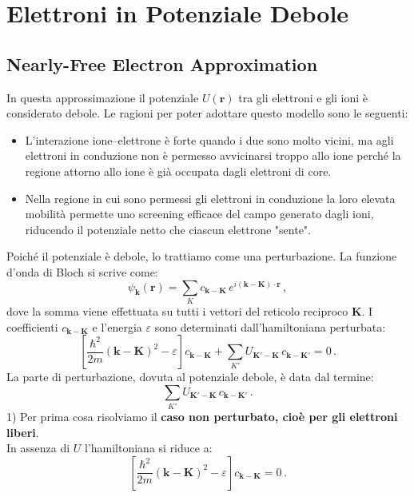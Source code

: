 
\chapter{Elettroni in Potenziale Debole}

\section{Nearly-Free Electron Approximation}
In questa approssimazione il potenziale \( U(\mathbf{r}) \) tra gli elettroni e gli ioni è considerato debole. Le ragioni per poter adottare questo modello sono le seguenti:
\begin{itemize}
	\item L'interazione ione--elettrone è forte quando i due sono molto vicini, ma agli elettroni in conduzione non è permesso avvicinarsi troppo allo ione perché la regione attorno allo ione è già occupata dagli elettroni di core.
	\item Nella regione in cui sono permessi gli elettroni in conduzione la loro elevata mobilità permette uno screening efficace del campo generato dagli ioni, riducendo il potenziale netto che ciascun elettrone "sente".
\end{itemize}
Poiché il potenziale è debole, lo trattiamo come una perturbazione.
La funzione d'onda di Bloch si scrive come:
\[
\psi_{\mathbf{k}}(\mathbf{r}) = \sum_{K} c_{\mathbf{k}-\mathbf{K}}\, e^{i (\mathbf{k}-\mathbf{K})\cdot \mathbf{r}}\,,
\]
dove la somma viene effettuata su tutti i vettori del reticolo reciproco \(\mathbf{K}\).
I coefficienti \(c_{\mathbf{k}-\mathbf{K}}\) e l'energia \(\varepsilon\) sono determinati dall'hamiltoniana perturbata:
\begin{equation}
\left[ \frac{\hbar^2}{2m} (\mathbf{k} - \mathbf{K})^2 - \varepsilon \right] c_{\mathbf{k}-\mathbf{K}} + \sum_{K'} U_{\mathbf{K'}- \mathbf{K}} \, c_{\mathbf{k}-\mathbf{K'}} = 0\,.
\label{eqn:hampotdebole}
\end{equation}
La parte di perturbazione, dovuta al potenziale debole, è data dal termine:
\begin{equation}
\sum_{K'} U_{\mathbf{K'}- \mathbf{K}} \, c_{\mathbf{k}-\mathbf{K'}}\,.
\label{eqn:perturbazione}
\end{equation}
1) Per prima cosa risolviamo il \textbf{caso non perturbato, cioè per gli elettroni liberi}. \\
In assenza di \(U\) l'hamiltoniana si riduce a:
\[
\left[ \frac{\hbar^2}{2m}(\mathbf{k}-\mathbf{K})^2 - \varepsilon \right] c_{\mathbf{k}-\mathbf{K}} = 0\,.
\]
